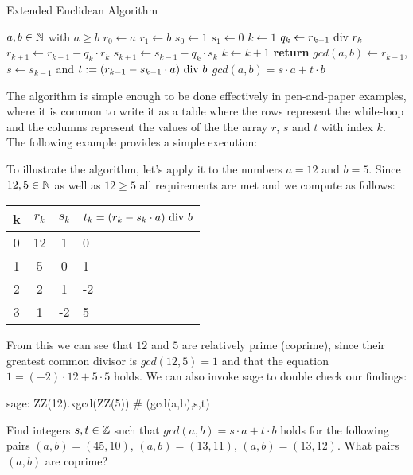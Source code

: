 \begin{algorithm}\caption{Extended Euclidean Algorithm}
\label{alg_ext_euclid_alg}
\begin{algorithmic}[0]
\Require $a,b \in \mathbb{N}$ with $a\geq b$
\State $r_0\gets a$
\State $r_1\gets b$
\State $s_0\gets 1$
\State $s_1\gets 0$
\State $k\gets 1$
\State $ q_k\gets r_{k-1} \text{ div } r_k $
\State $ r_{k + 1}\gets r_{k-1} -q_k \cdot r_k $
\State $ s_{k + 1}\gets s_{k-1} -q_k \cdot s_k $
\State $ k \gets k + 1 $
\EndWhile
\State \textbf{return} $gcd(a,b)\gets r_{k-1}$, $s\gets s_{k-1}$ and $ t: = (r_{k-1}-s_{k-1} \cdot a) \text{ div } b $ 
\EndProcedure
\Ensure $ gcd (a, b) = s \cdot a + t \cdot b $
\end{algorithmic}
\end{algorithm}
The algorithm is simple enough to be done effectively in pen-and-paper examples, where it is common to write it as a table where the rows represent the while-loop and the columns represent the values of the the array $r$, $s$ and $t$ with index $k$. The following example provides a simple execution:
\begin{example} To illustrate the algorithm, let's apply it to the numbers $a=12$ and $b=5$. Since $12,5\in \mathbb{N}$ as well as $12\geq 5$ all requirements are met and we compute as follows:
\begin{center}
  \begin{tabular}{c | c c l}
    k & $ r_k $ & $ s_k $ & $ t_k = (r_k-s_k \cdot a) \text{ div } b $ \\\hline
    0 & 12 & 1 & 0 \\
    1 & 5 & 0 & 1 \\
    2 & 2 & 1 & -2 \\
    3 & 1 & -2 & 5 \\
  \end{tabular}
\end{center}
From this we can see that $ 12 $ and $ 5 $ are relatively prime (coprime), since their greatest common divisor is $ gcd (12, 5) = 1 $ and that the equation $ 1 = (-2) \cdot 12 + 5 \cdot 5 $ holds. We can also invoke sage to double check our findings:
\begin{sagecommandline}
sage: ZZ(12).xgcd(ZZ(5)) # (gcd(a,b),s,t)
\end{sagecommandline}
\end{example}
\begin{exercise}
Find integers $s,t\in\mathbb{Z}$ such that $gcd(a,b)= s\cdot a +t\cdot b$ holds for the following pairs $(a,b) = (45,10)$, $(a,b)=(13,11)$, $(a,b)=(13,12)$. What pairs $(a,b)$ are coprime?
\end{exercise}

